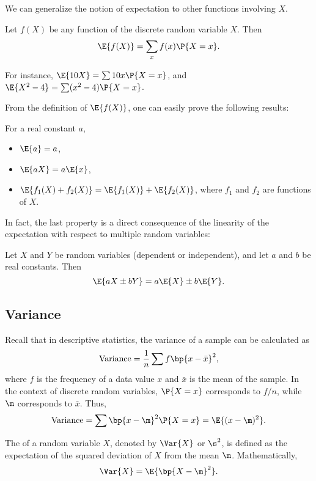 We can generalize the notion of expectation to other functions involving $X$.

\begin{definition}
    Let $f(X)$ be any function of the discrete random variable $X$. Then \[\E{f(X)} = \sum_{x} f(x) \P{X = x}.\]
\end{definition}

For instance, $\E{10 X} = \sum 10 x \P{X = x}$, and $\E{X^2 - 4} = \sum (x^2 - 4) \P{X = x}$.

From the definition of $\E{f(X)}$, one can easily prove the following results:
\begin{proposition}
    For a real constant $a$,
    \begin{itemize}
        \item $\E{a} = a$,
        \item $\E{aX} = a\E{x}$,
        \item $\E{f_1(X) + f_2(X)} = \E{f_1(X)} + \E{f_2(X)}$, where $f_1$ and $f_2$ are functions of $X$.
    \end{itemize}
\end{proposition}

In fact, the last property is a direct consequence of the linearity of the expectation with respect to multiple random variables:

\begin{proposition}
    Let $X$ and $Y$ be random variables (dependent or independent), and let $a$ and $b$ be real constants. Then \[\E{aX \pm bY} = a\E{X} \pm b\E{Y}.\]
\end{proposition}

\subsection{Variance}

Recall that in descriptive statistics, the variance of a sample can be calculated as \[\text{Variance} = \frac1n \sum f\bp{x - \bar x}^2,\] where $f$ is the frequency of a data value $x$ and $\bar x$ is the mean of the sample. In the context of discrete random variables, $\P{X = x}$ corresponds to $f/n$, while $\m$ corresponds to $\bar x$. Thus, \[\text{Variance} = \sum \bp{x - \m}^2 \P{X = x} = \E{(x- \m)^2}.\]

\begin{definition}
    The  of a random variable $X$, denoted by $\Var{X}$ or $\s^2$, is defined as the expectation of the squared deviation of $X$ from the mean $\m$. Mathematically, \[\Var{X} = \E{\bp{X - \m}^2}.\]
\end{definition}

